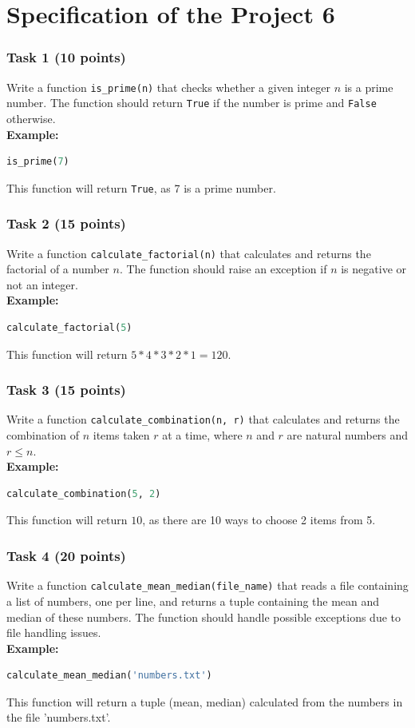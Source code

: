 \documentclass[12pt]{book}
\begin{document}
\section{Specification of the Project 6}

\subsubsection{Task 1 (10 points)}
Write a function \texttt{is\_prime(n)} that checks whether a given integer $n$ is a prime number. The function should return \texttt{True} if the number is prime and \texttt{False} otherwise. \\
\textbf{Example:}
\begin{lstlisting}[language=Python]
is_prime(7)
\end{lstlisting}
This function will return \texttt{True}, as 7 is a prime number.

\subsubsection{Task 2 (15 points)}
Write a function \texttt{calculate\_factorial(n)} that calculates and returns the factorial of a number $n$. The function should raise an exception if $n$ is negative or not an integer. \\
\textbf{Example:}
\begin{lstlisting}[language=Python]
calculate_factorial(5)
\end{lstlisting}
This function will return $5*4*3*2*1 = 120$.

\subsubsection{Task 3 (15 points)}
Write a function \texttt{calculate\_combination(n, r)} that calculates and returns the combination of $n$ items taken $r$ at a time, where $n$ and $r$ are natural numbers and $r \leq n$. \\
\textbf{Example:}
\begin{lstlisting}[language=Python]
calculate_combination(5, 2)
\end{lstlisting}
This function will return $10$, as there are 10 ways to choose 2 items from 5.

\subsubsection{Task 4 (20 points)}
Write a function \texttt{calculate\_mean\_median(file\_name)} that reads a file containing a list of numbers, one per line, and returns a tuple containing the mean and median of these numbers. The function should handle possible exceptions due to file handling issues. \\
\textbf{Example:}
\begin{lstlisting}[language=Python]
calculate_mean_median('numbers.txt')
\end{lstlisting}
This function will return a tuple (mean, median) calculated from the numbers in the file 'numbers.txt'.
\end{document}
